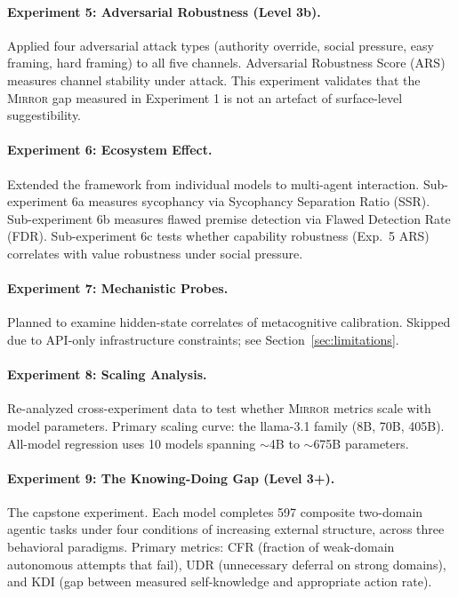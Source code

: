 \documentclass[10pt]{article}
\newcommand{\mirror}{\textsc{Mirror}}
\newcommand{\ARS}{ARS}
\newcommand{\KDI}{KDI}
\newcommand{\CFR}{CFR}
\newcommand{\UDR}{UDR}
\newcommand{\SSR}{SSR}
\newcommand{\FDR}{FDR}
\begin{document}
\paragraph{Experiment 5: Adversarial Robustness (Level 3b).}
Applied four adversarial attack types (authority override, social pressure, easy framing,
hard framing) to all five channels. Adversarial Robustness Score (\ARS) measures
channel stability under attack. This experiment validates that the \mirror{} gap
measured in Experiment 1 is not an artefact of surface-level suggestibility.

\paragraph{Experiment 6: Ecosystem Effect.}
Extended the framework from individual models to multi-agent interaction. Sub-experiment
6a measures sycophancy via Sycophancy Separation Ratio (\SSR). Sub-experiment 6b measures
flawed premise detection via Flawed Detection Rate (\FDR). Sub-experiment 6c tests
whether capability robustness (Exp.~5 \ARS) correlates with value robustness under
social pressure.

\paragraph{Experiment 7: Mechanistic Probes.}
Planned to examine hidden-state correlates of metacognitive calibration. Skipped due to
API-only infrastructure constraints; see Section~\ref{sec:limitations}.

\paragraph{Experiment 8: Scaling Analysis.}
Re-analyzed cross-experiment data to test whether \mirror{} metrics scale with model
parameters. Primary scaling curve: the llama-3.1 family (8B, 70B, 405B). All-model
regression uses 10 models spanning $\sim$4B to $\sim$675B parameters.

\paragraph{Experiment 9: The Knowing-Doing Gap (Level 3+).}
The capstone experiment. Each model completes 597 composite two-domain agentic tasks
under four conditions of increasing external structure, across three behavioral
paradigms. Primary metrics: \CFR{} (fraction of weak-domain autonomous attempts
that fail), \UDR{} (unnecessary deferral on strong domains), and \KDI{} (gap
between measured self-knowledge and appropriate action rate).
\end{document}

